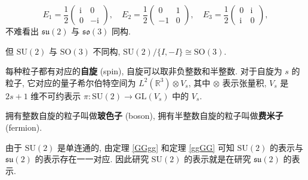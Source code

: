 \[ E_1=\frac{1}{2}\left(\begin{matrix}
    \mathrm{i} & 0\\ 
    0 & -\mathrm{i}
\end{matrix}\right),\quad E_2=\frac{1}{2}\left(\begin{matrix}
    0 & 1\\ 
    -1 & 0
\end{matrix}\right),\quad E_3=\frac{1}{2}\left(\begin{matrix}
    0 & \mathrm{i}\\ 
    \mathrm{i} & 0
\end{matrix}\right), \]
不难看出 $ \mathfrak{su}(2) $ 与 $ \mathfrak{so}(3) $ 同构. 
\begin{remark}
    但 $ \mathrm{SU}(2) $ 与 $ \mathrm{SO}(3) $ 不同构, $ \mathrm{SU}(2)/\{I,-I\}\cong\mathrm{SO}(3) $.
\end{remark}

\begin{definition}[自旋]
    每种粒子都有对应的{\bf 自旋} (spin), 自旋可以取非负整数和半整数. 对于自旋为 $ s $ 的粒子, 它对应的量子希尔伯特空间为 $ L^2(\mathbb{R}^3)\otimes V_s $, 其中 $ \otimes $ 表示张量积, $ V_s $ 是 $ 2s+1 $ 维不可约表示 $ \pi:\mathrm{SU}(2)\to\mathrm{GL}(V_s) $ 中的 $ V_s $.
\end{definition}

\begin{definition}
    拥有整数自旋的粒子叫做{\bf 玻色子} (boson), 拥有半整数自旋的粒子叫做{\bf 费米子} (fermion).
\end{definition}

由于 $ \mathrm{SU}(2) $ 是单连通的, 由定理 \ref{GGgg} 和定理 \ref{ggGG} 可知 $ \mathrm{SU}(2) $ 的表示与 $ \mathfrak{su}(2) $ 的表示存在一一对应. 因此研究 $ \mathrm{SU}(2) $ 的表示就是在研究 $ \mathfrak{su}(2) $ 的表示.

